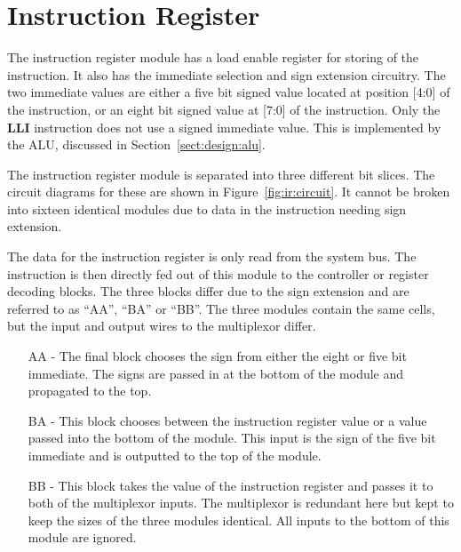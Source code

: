 
\section{Instruction Register}


The instruction register module has a load enable register for storing of the instruction.
It also has the immediate selection and sign extension circuitry.
The two immediate values are either a five bit signed value located at position [4:0] of the instruction, or an eight bit signed value at [7:0] of the instruction.
Only the \textbf{LLI} instruction does not use a signed immediate value. 
This is implemented by the ALU, discussed in Section~\ref{sect:design:alu}.


The instruction register module is separated into three different bit slices.
The circuit diagrams for these are shown in Figure~\ref{fig:ir:circuit}.
It cannot be broken into sixteen identical modules due to data in the instruction needing sign extension. 

The data for the instruction register is only read from the system bus. 
The instruction is then directly fed out of this module to the controller or register decoding blocks.
The three blocks differ due to the sign extension and are referred to as ``AA'', ``BA'' or ``BB''.
The three modules contain the same cells, but the input and output wires to the multiplexor differ. 
\begin{enumerate}
\item[AA] - The final block chooses the sign from either the eight or five bit immediate. The signs are passed in at the bottom of the module and propagated to the top.
\item[BA] - This block chooses between the instruction register value or a value passed into the bottom of the module. This input is the sign of the five bit immediate and is outputted to the top of the module.
\item[BB] - This block takes the value of the instruction register and passes it to both of the multiplexor inputs. The multiplexor is redundant here but kept to keep the sizes of the three modules identical. All inputs to the bottom of this module are ignored.
\end{enumerate}

